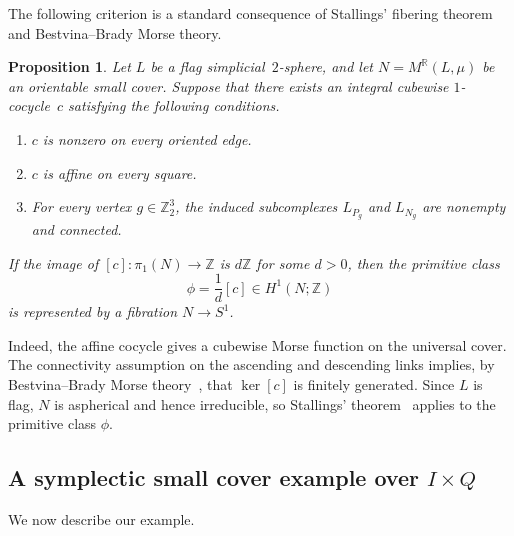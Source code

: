 \documentclass{amsart}
\newtheorem{proposition}[theorem]{Proposition}
\numberwithin{equation}{section}
\theoremstyle{definition}
\theoremstyle{remark}
\newcommand{\Z}{\mathbb Z}
\newcommand{\R}{\mathbb R}
\begin{document}
The following criterion is a standard consequence of Stallings' fibering theorem and Bestvina--Brady Morse theory.
\begin{proposition}\label{prop:fibering-criterion-small-cover}
    Let $L$ be a flag simplicial~$2$-sphere, and let
    $N=M^\R(L,\mu)$ be an orientable small cover.
    Suppose that there exists an integral cubewise $1$-cocycle~$c$ satisfying
    the following conditions.
    \begin{enumerate}
        \item $c$ is nonzero on every oriented edge.
        \item $c$ is affine on every square.
        \item For every vertex $g\in\Z_2^3$, the induced subcomplexes $L_{P_g}$ and $L_{N_g}$ are nonempty and connected.
    \end{enumerate}
    If the image of $[c]\colon\pi_1(N)\to\Z$ is $d\Z$ for some $d>0$, then the primitive class
    $$
        \phi=\frac{1}{d}[c]\in H^1(N;\Z)
    $$
    is represented by a fibration $N\to S^1$.
\end{proposition}

Indeed, the affine cocycle gives a cubewise Morse function on the universal cover. 
The connectivity assumption on the ascending and descending links implies, by Bestvina--Brady Morse theory~\cite{Bestvina-Brady1997}, that $\ker[c]$ is finitely generated. 
Since $L$ is flag, $N$ is aspherical and hence irreducible, so Stallings' theorem~\cite{Stallings1961} applies to the primitive class $\phi$.


\subsection{A symplectic small cover example over $I\times Q$}
We now describe our example.
\end{document}
